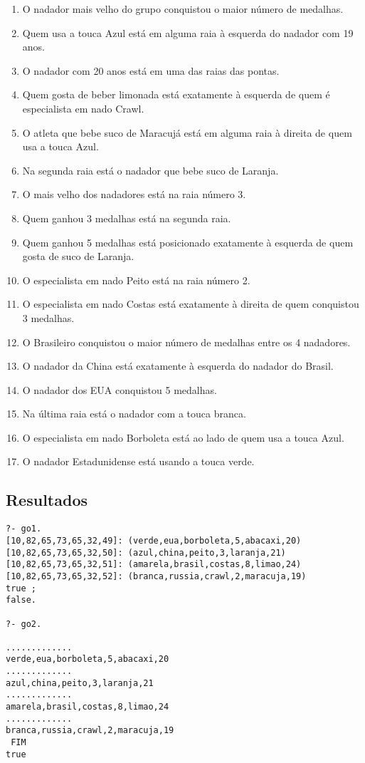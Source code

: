 \documentclass[final,a4paper]{article}
\begin{document}
\begin{enumerate}
  \item  O nadador mais velho do grupo conquistou o maior número de medalhas.
   \item Quem usa a touca Azul está em alguma raia à esquerda do nadador com 19 anos.
   \item O nadador com 20 anos está em uma das raias das pontas.
   \item Quem gosta de beber limonada está exatamente à esquerda de quem é especialista em nado Crawl.
   \item  O atleta que bebe suco de Maracujá está em alguma raia à direita de quem usa a touca Azul.
   \item Na segunda raia está o nadador que bebe suco de Laranja.
   \item O mais velho dos nadadores está na raia número 3.
   \item Quem ganhou 3 medalhas está na segunda raia.
   \item Quem ganhou 5 medalhas está posicionado exatamente à esquerda de quem gosta de suco de Laranja.
\item  O especialista em nado Peito está na raia número 2.
\item  O especialista em nado Costas está exatamente à direita de quem conquistou 3 medalhas.
\item  O Brasileiro conquistou o maior número de medalhas entre os 4 nadadores.
\item  O nadador da China está exatamente à esquerda do nadador do Brasil.
\item  O nadador dos EUA conquistou 5 medalhas.
\item  Na última raia está o nadador com a touca branca.
\item  O especialista em nado Borboleta está ao lado de quem usa a touca Azul.
\item  O nadador Estadunidense está usando a touca verde.

 \end{enumerate} 




\subsection{Resultados}


\begin{verbatim}
?- go1.
[10,82,65,73,65,32,49]: (verde,eua,borboleta,5,abacaxi,20)
[10,82,65,73,65,32,50]: (azul,china,peito,3,laranja,21)
[10,82,65,73,65,32,51]: (amarela,brasil,costas,8,limao,24)
[10,82,65,73,65,32,52]: (branca,russia,crawl,2,maracuja,19)
true ;
false.

?- go2.

.............
verde,eua,borboleta,5,abacaxi,20
.............
azul,china,peito,3,laranja,21
.............
amarela,brasil,costas,8,limao,24
.............
branca,russia,crawl,2,maracuja,19
 FIM 
true 
\end{verbatim}
\end{document}
